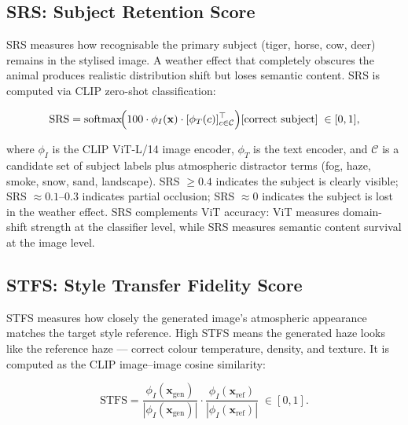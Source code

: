 \FloatBarrier
\subsection{SRS: Subject Retention Score}
\label{sec:srs}

\noindent SRS measures how recognisable the primary subject (tiger, horse, cow, deer) remains in the stylised image. A weather effect that completely obscures the animal produces realistic distribution shift but loses semantic content. SRS is computed via CLIP zero-shot classification:

\begin{equation}
    \text{SRS} = \operatorname{softmax}\!\Bigl(100 \cdot \phi_I(\mathbf{x}) \cdot [\phi_T(c)]_{c \in \mathcal{C}}^\top\Bigr)[\text{correct subject}] \;\in [0,1],
    \label{eq:srs}
\end{equation}

\noindent where $\phi_I$ is the CLIP ViT-L/14 image encoder, $\phi_T$ is the text encoder, and $\mathcal{C}$ is a candidate set of subject labels plus atmospheric distractor terms (fog, haze, smoke, snow, sand, landscape). SRS $\geq 0.4$ indicates the subject is clearly visible; SRS $\approx 0.1$--$0.3$ indicates partial occlusion; SRS $\approx 0$ indicates the subject is lost in the weather effect. SRS complements ViT accuracy: ViT measures domain-shift strength at the classifier level, while SRS measures semantic content survival at the image level.

\FloatBarrier
\subsection{STFS: Style Transfer Fidelity Score}
\label{sec:stfs}

\noindent STFS measures how closely the generated image's atmospheric appearance matches the target style reference. High STFS means the generated haze looks like the reference haze --- correct colour temperature, density, and texture. It is computed as the CLIP image--image cosine similarity:

\begin{equation}
    \text{STFS} = \frac{\phi_I(\mathbf{x}_{\text{gen}})}{|\phi_I(\mathbf{x}_{\text{gen}})|} \cdot \frac{\phi_I(\mathbf{x}_{\text{ref}})}{|\phi_I(\mathbf{x}_{\text{ref}})|} \;\in [0,1].
    \label{eq:stfs}
\end{equation}

